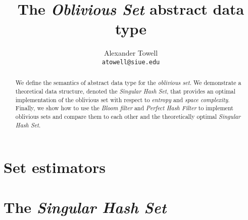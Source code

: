 \documentclass[final,11pt,hidelinks]{article}
\title
{
    The \emph{Oblivious Set} abstract data type
}
\author
{
    Alexander Towell\\
    \texttt{atowell@siue.edu}
}
\date{}
\begin{document}
\maketitle
\begin{abstract}
We define the semantics of abstract data type for the \emph{oblivious set}. We demonstrate a theoretical data structure, denoted the \emph{Singular Hash Set}, that provides an optimal implementation of the oblivious set with respect to \emph{entropy} and \emph{space complexity}. Finally, we show how to use the \emph{Bloom filter} and \emph{Perfect Hash Filter} to implement oblivious sets and compare them to each other and the theoretically optimal \emph{Singular Hash Set}.
\end{abstract}


\tableofcontents
{}






\section{Set estimators}
\label{sec:estimators}


\section{The \emph{Singular Hash Set}}
\label{sec:shs}



\printglossary

\end{document}

